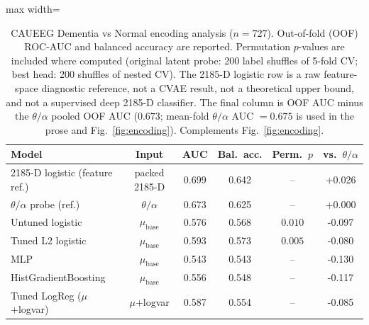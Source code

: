 \begin{table}[!t]
\centering
\footnotesize
\setlength{\tabcolsep}{3pt}
\caption{CAUEEG Dementia vs Normal encoding analysis ($n = 727$).
Out-of-fold (OOF) ROC-AUC and balanced accuracy are reported.
Permutation $p$-values are included where computed (original latent probe:
200 label shuffles of 5-fold CV; best head: 200 shuffles of nested CV).
The 2185-D logistic row is a raw feature-space diagnostic reference, not a CVAE result,
not a theoretical upper bound, and not a supervised deep 2185-D classifier. The final column is OOF AUC minus the $\theta/\alpha$
pooled OOF AUC ($0.673$; mean-fold $\theta/\alpha$ AUC $= 0.675$ is used in the prose
and Fig.~\ref{fig:encoding}). Complements Fig.~\ref{fig:encoding}.}
\label{tab:encoding-results}
\begin{adjustbox}{max width=\columnwidth}
\begin{tabular}{@{}lccccc@{}}
\toprule
Model & Input & AUC & Bal.\ acc. & Perm.\ $p$ & vs.\ $\theta/\alpha$ \\
\midrule
  2185-D logistic (feature ref.) & packed 2185-D & 0.699 & 0.642 & -- & +0.026 \\
  $\theta/\alpha$ probe (ref.) & $\theta/\alpha$ & 0.673 & 0.625 & -- & +0.000 \\
  Untuned logistic & $\mu_{\mathrm{base}}$ & 0.576 & 0.568 & $0.010$ & -0.097 \\
  Tuned L2 logistic & $\mu_{\mathrm{base}}$ & 0.593 & 0.573 & $0.005$ & -0.080 \\
  MLP & $\mu_{\mathrm{base}}$ & 0.543 & 0.543 & -- & -0.130 \\
  HistGradientBoosting & $\mu_{\mathrm{base}}$ & 0.556 & 0.548 & -- & -0.117 \\
  Tuned LogReg ($\mu$+logvar) & $\mu$+logvar & 0.587 & 0.554 & -- & -0.085 \\
\bottomrule
\end{tabular}
\end{adjustbox}
\end{table}
